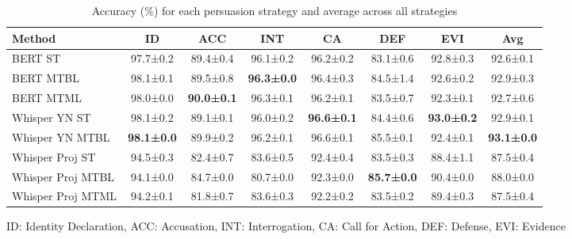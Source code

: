 \documentclass{article}
\begin{document}
\begin{table}[ht]
\centering
\small
\caption{Accuracy (\%) for each persuasion strategy and average across all strategies}
\setlength{\tabcolsep}{4pt}
\begin{tabular}{@{}lccccccc@{}}
\toprule
Method & ID & ACC & INT & CA & DEF & EVI & Avg \\
\midrule
BERT ST & 97.7±0.2 & 89.4±0.4 & 96.1±0.2 & 96.2±0.2 & 83.1±0.6 & 92.8±0.3 & 92.6±0.1 \\
BERT MTBL & 98.1±0.1 & 89.5±0.8 & \textbf{96.3±0.0} & 96.4±0.3 & 84.5±1.4 & 92.6±0.2 & 92.9±0.3 \\
BERT MTML & 98.0±0.0 & \textbf{90.0±0.1} & 96.3±0.1 & 96.2±0.1 & 83.5±0.7 & 92.3±0.1 & 92.7±0.6 \\
Whisper YN ST & 98.1±0.2 & 89.1±0.1 & 96.0±0.2 & \textbf{96.6±0.1} & 84.4±0.6 & \textbf{93.0±0.2} & 92.9±0.1 \\
Whisper YN MTBL & \textbf{98.1±0.0} & 89.9±0.2 & 96.2±0.1 & 96.6±0.1 & 85.5±0.1 & 92.4±0.1 & \textbf{93.1±0.0} \\
Whisper Proj ST & 94.5±0.3 & 82.4±0.7 & 83.6±0.5 & 92.4±0.4 & 83.5±0.3 & 88.4±1.1 & 87.5±0.4 \\
Whisper Proj MTBL & 94.1±0.0 & 84.7±0.0 & 80.7±0.0 & 92.3±0.0 & \textbf{85.7±0.0} & 90.4±0.0 & 88.0±0.0 \\
Whisper Proj MTML & 94.2±0.1 & 81.8±0.7 & 83.6±0.3 & 92.2±0.2 & 83.5±0.2 & 89.4±0.3 & 87.5±0.4 \\
\bottomrule
\end{tabular}
\parbox{\textwidth}{\small ID: Identity Declaration, ACC: Accusation, INT: Interrogation, CA: Call for Action, DEF: Defense, EVI: Evidence}
\end{table}
\end{document}

